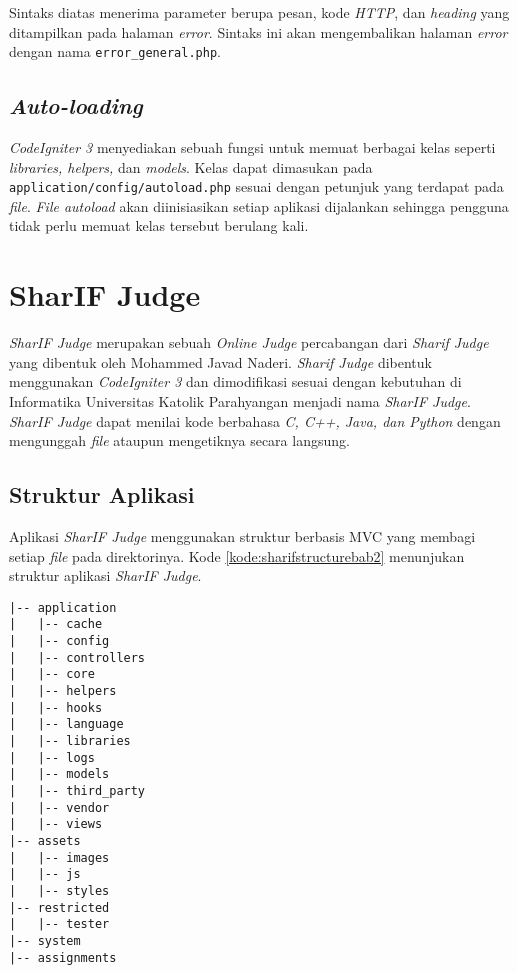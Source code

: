 Sintaks diatas menerima parameter berupa pesan, kode \textit{HTTP}, dan \textit{heading} yang ditampilkan pada halaman \textit{error}. Sintaks ini akan mengembalikan halaman \textit{error} dengan nama \texttt{error\_general.php}.

\subsection{\textit{Auto-loading}}
\textit{CodeIgniter 3} menyediakan sebuah fungsi untuk memuat berbagai kelas seperti \textit{libraries, helpers,} dan \textit{models}. Kelas dapat dimasukan pada \texttt{application/config/autoload.php} sesuai dengan petunjuk yang terdapat pada \textit{file}. \textit{File autoload} akan diinisiasikan setiap aplikasi dijalankan sehingga pengguna tidak perlu memuat kelas tersebut berulang kali. 

\section{SharIF Judge \cite{sharif:23}}
\label{sec:judge}

\textit{SharIF Judge} merupakan sebuah \textit{Online Judge} percabangan dari \textit{Sharif Judge} yang dibentuk oleh Mohammed Javad Naderi. \textit{Sharif Judge} dibentuk menggunakan \textit{CodeIgniter 3} dan dimodifikasi sesuai dengan kebutuhan di Informatika Universitas Katolik Parahyangan menjadi nama \textit{SharIF Judge}. \textit{SharIF Judge} dapat menilai kode berbahasa \textit{C, C++, Java, dan Python} dengan mengunggah \textit{file} ataupun mengetiknya secara langsung.

\subsection{Struktur Aplikasi}
\label{subsec:judgestructure}

Aplikasi \textit{SharIF Judge} menggunakan struktur berbasis MVC yang membagi setiap \textit{file} pada direktorinya. Kode \ref{kode:sharifstructurebab2} menunjukan struktur aplikasi \textit{SharIF Judge}.
\begin{lstlisting}[caption=Struktur aplikasi \textit{SharIF Judge},label=kode:sharifstructurebab2]
|-- application
|   |-- cache
|   |-- config
|   |-- controllers
|   |-- core
|   |-- helpers
|   |-- hooks
|   |-- language
|   |-- libraries
|   |-- logs
|   |-- models
|   |-- third_party
|   |-- vendor
|   |-- views
|-- assets
|   |-- images
|   |-- js
|   |-- styles
|-- restricted
|   |-- tester
|-- system
|-- assignments
\end{lstlisting}

